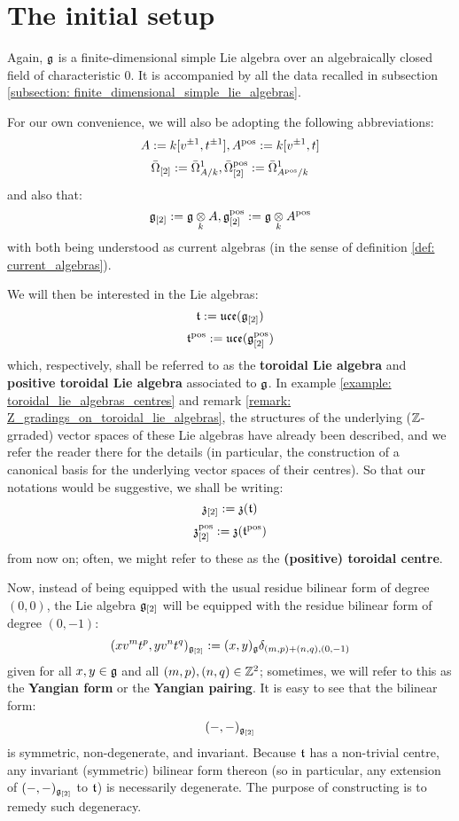 \section{The initial setup}
    Again, $\mathfrak{g}$ is a finite-dimensional simple Lie algebra over an algebraically closed field of characteristic $0$. It is accompanied by all the data recalled in subsection \ref{subsection: finite_dimensional_simple_lie_algebras}. 

    For our own convenience, we will also be adopting the following abbreviations:
        $$A := k[v^{\pm 1}, t^{\pm 1}], A^{\mathrm{pos}} := k[v^{\pm 1}, t]$$
        $$\bar{\Omega}_{[2]} := \bar{\Omega}^1_{A/k}, \bar{\Omega}_{[2]}^{\mathrm{pos}} := \bar{\Omega}^1_{A^{\mathrm{pos}}/k}$$
    and also that:
        $$\g_{[2]} := \g \tensor_k A, \g_{[2]}^{\positive} := \g \tensor_k A^{\positive}$$
    with both being understood as current algebras (in the sense of definition \ref{def: current_algebras}).

    We will then be interested in the Lie algebras:
        $$\mathfrak{t} := \mathfrak{uce}(\mathfrak{g}_{[2]})$$
        $$\mathfrak{t}^{\mathrm{pos}} := \mathfrak{uce}(\mathfrak{g}_{[2]}^{\mathrm{pos}})$$
    which, respectively, shall be referred to as the \textbf{toroidal Lie algebra} and \textbf{positive toroidal Lie algebra} associated to $\mathfrak{g}$. In example \ref{example: toroidal_lie_algebras_centres} and remark \ref{remark: Z_gradings_on_toroidal_lie_algebras}, the structures of the underlying ($\mathbb{Z}$-grraded) vector spaces of these Lie algebras have already been described, and we refer the reader there for the details (in particular, the construction of a canonical basis for the underlying vector spaces of their centres). So that our notations would be suggestive, we shall be writing:
        $$\mathfrak{z}_{[2]} := \mathfrak{z}(\mathfrak{t})$$
        $$\mathfrak{z}_{[2]}^{\mathrm{pos}} := \mathfrak{z}(\mathfrak{t}^{\mathrm{pos}})$$
    from now on; often, we might refer to these as the \textbf{(positive) toroidal centre}.
    
    Now, instead of being equipped with the usual residue bilinear form of degree $(0, 0)$, the Lie algebra $\mathfrak{g}_{[2]}$ will be equipped with the residue bilinear form of degree $(0, -1)$:
        $$(x v^m t^p, y v^n t^q)_{\mathfrak{g}_{[2]}} := (x, y)_{\mathfrak{g}} \delta_{(m, p) + (n, q), (0, -1)}$$
    given for all $x, y \in \mathfrak{g}$ and all $(m, p), (n, q) \in \mathbb{Z}^2$; sometimes, we will refer to this as the \textbf{Yangian form} or the \textbf{Yangian pairing}. It is easy to see that the bilinear form:
        $$(-, -)_{\mathfrak{g}_{[2]}}$$
    is symmetric, non-degenerate, and invariant. Because $\mathfrak{t}$ has a non-trivial centre, any invariant (symmetric) bilinear form thereon (so in particular, any extension of $(-, -)_{\mathfrak{g}_{[2]}}$ to $\mathfrak{t}$) is necessarily degenerate. The purpose of constructing  is to remedy such degeneracy.